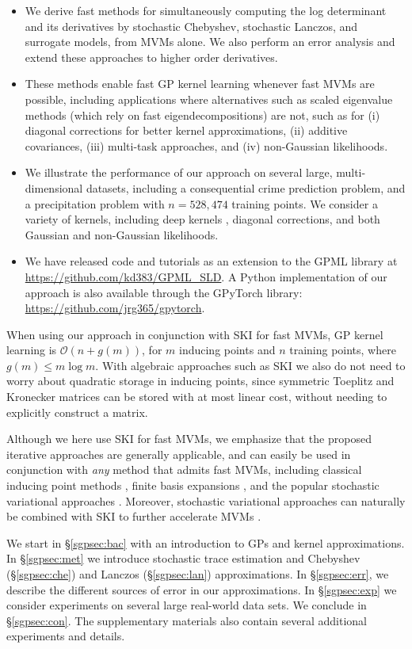 \vspace{-1mm}
\begin{itemize}
  \item We derive fast methods for simultaneously computing the log determinant
  and its derivatives by stochastic Chebyshev, stochastic Lanczos, and surrogate
  models, from MVMs alone. We also perform an error analysis and extend these
  approaches to higher order derivatives.

  \item These methods enable fast GP kernel learning whenever fast MVMs are
  possible, including applications where alternatives such as scaled eigenvalue
  methods (which rely on fast eigendecompositions) are not, such as for (i)
  diagonal corrections for better kernel approximations, (ii) additive
  covariances, (iii) multi-task approaches, and (iv) non-Gaussian likelihoods.

  \item We illustrate the performance of our approach on several large,
  multi-dimensional datasets, including a consequential crime prediction
  problem, and a precipitation problem with $n = 528,474$ training points. We
  consider a variety of kernels, including deep kernels \citep{wilson2016deep},
  diagonal corrections, and both Gaussian and non-Gaussian likelihoods.
  \item We have released code and tutorials as an extension to the GPML library 
  \citep{rasmussen10gpml} at \url{https://github.com/kd383/GPML_SLD}. A Python
  implementation of our approach is also available through the GPyTorch library:
  \url{https://github.com/jrg365/gpytorch}.
\end{itemize}
\vspace{-1mm}
When using our approach in conjunction with SKI \citep{wilson2015kernel} for
fast MVMs, GP kernel learning is $\mathcal{O}(n + g(m))$, for $m$ inducing
points and $n$ training points, where $g(m) \leq m \log m$. With algebraic
approaches such as SKI we also do not need to worry about quadratic storage in
inducing points, since symmetric Toeplitz and Kronecker matrices can be stored
with at most linear cost, without needing to explicitly construct a matrix.

Although we here use SKI for fast MVMs, we emphasize that the proposed iterative
approaches are generally applicable, and can easily be used in conjunction with
\emph{any} method that admits fast MVMs, including classical inducing point
methods \citep{quinonero2005unifying}, finite basis expansions 
\citep{le2013fastfood}, and the popular stochastic variational approaches 
\citep{hensman2013uai}.  Moreover, stochastic variational approaches can
naturally be combined with SKI to further accelerate MVMs 
\citep{wilson2016stochastic}.

We start in \S \ref{sgpsec:bac} with an introduction to GPs and kernel
approximations.  In \S \ref{sgpsec:met} we introduce stochastic trace estimation
and Chebyshev (\S \ref{sgpsec:che}) and Lanczos (\S \ref{sgpsec:lan})
approximations. In \S \ref{sgpsec:err}, we describe the different sources of
error in our approximations. In \S \ref{sgpsec:exp} we consider experiments on
several large real-world data sets. We conclude in \S \ref{sgpsec:con}. The
supplementary materials also contain several additional experiments and details.